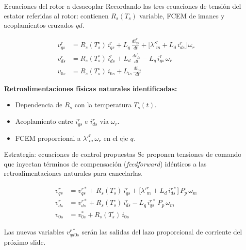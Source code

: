 \documentclass[aspectratio=169,t]{beamer}
\begin{document}
\begin{frame}{Ecuaciones del rotor a desacoplar}
{\small\color{uncGray}Recordando las tres ecuaciones de tensión del estator referidas al rotor: contienen $R_s(T_s)$ variable, FCEM de imanes y acoplamientos cruzados $qd$.}\par
\vspace{2mm}

\begin{align*}
v_{qs}^{r} &= R_s(T_s^\circ)\,i_{qs}^{r} + L_q\,\tfrac{d i_{qs}^{r}}{dt} + \big[\lambda'^r_m + L_d\,i_{ds}^{r}\big]\,\omega_r \\[3pt]
v_{ds}^{r} &= R_s(T_s^\circ)\,i_{ds}^{r} + L_d\,\tfrac{d i_{ds}^{r}}{dt} - L_q\,i_{qs}^{r}\,\omega_r \\[3pt]
v_{0s} &= R_s(T_s^\circ)\,i_{0s} + L_{ls}\,\tfrac{d i_{0s}}{dt}
\end{align*}

\vspace{2mm}
\textbf{Retroalimentaciones físicas naturales identificadas:}
\begin{itemize}
\item Dependencia de $R_s$ con la temperatura $T_s^\circ(t)$.
\item Acoplamiento entre $i_{qs}^{r}$ e $i_{ds}^{r}$ vía $\omega_r$.
\item FCEM proporcional a $\lambda'^r_m\,\omega_r$ en el eje $q$.
\end{itemize}
\end{frame}

\begin{frame}{Estrategia: ecuaciones de control propuestas}
{\small\color{uncGray}Se proponen tensiones de comando que inyectan términos de compensación (\emph{feedforward}) idénticos a las retroalimentaciones naturales para cancelarlas.}\par
\vspace{2mm}

\begin{align*}
v_{qs}^{r} &= v_{qs}^{r*} + R_s(T_s^\circ)\,i_{qs}^{r} + \big[\lambda'^r_m + L_d\,i_{ds}^{r*}\big]\,P_p\,\omega_m \\[3pt]
v_{ds}^{r} &= v_{ds}^{r*} + R_s(T_s^\circ)\,i_{ds}^{r} - L_q\,i_{qs}^{r*}\,P_p\,\omega_m \\[3pt]
v_{0s} &= v_{0s}^{*} + R_s(T_s^\circ)\,i_{0s}
\end{align*}

\vspace{2mm}
{\small Las nuevas variables $v_{qd0s}^{r*}$ serán las salidas del lazo proporcional de corriente del próximo slide.}
\end{frame}
\end{document}
